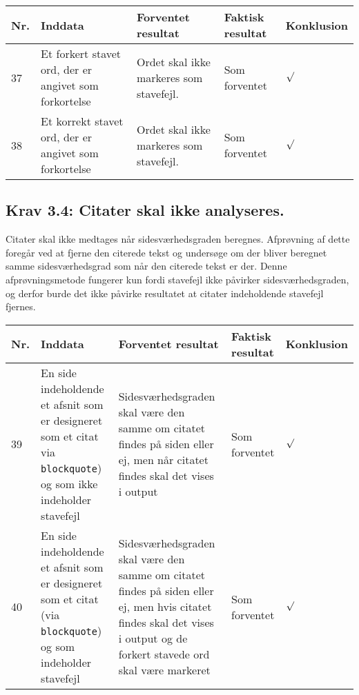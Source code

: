 \documentclass[a4paper,oneside,article]{memoir}
\begin{document}
\begin{landscape}
\begin{longtable}[c]{p{20pt}|p{220pt}|p{130pt}|p{130pt}|p{50pt}}
\textbf{Nr.} &
\textbf{Inddata} &
\textbf{Forventet resultat} &
\textbf{Faktisk resultat} &
\textbf{Konklusion} \\ \hline

37 &
Et forkert stavet ord, der er angivet som forkortelse &
Ordet skal ikke markeres som stavefejl. &
Som forventet &
$\surd$ \\ \hline

38 &
Et korrekt stavet ord, der er angivet som forkortelse &
Ordet skal ikke markeres som stavefejl. &
Som forventet &
$\surd$ \\ \hline

\end{longtable}

\subsection{Krav 3.4: Citater skal ikke analyseres.}

Citater skal ikke medtages når sidesværhedsgraden beregnes. Afprøvning
af dette foregår ved at fjerne den citerede tekst og undersøge om der
bliver beregnet samme sidesværhedsgrad som når den citerede tekst er
der. Denne afprøvningsmetode fungerer kun fordi stavefejl ikke
påvirker sidesværhedsgraden, og derfor burde det ikke påvirke
resultatet at citater indeholdende stavefejl fjernes.

\begin{longtable}[c]{p{20pt}|p{220pt}|p{130pt}|p{130pt}|p{50pt}}
\textbf{Nr.} &
\textbf{Inddata} &
\textbf{Forventet resultat} &
\textbf{Faktisk resultat} &
\textbf{Konklusion} \\ \hline

39 &
En side indeholdende et afsnit som er designeret som et citat
via \texttt{blockquote}) og som ikke indeholder stavefejl &
Sidesværhedsgraden skal være den samme om citatet findes på siden
eller ej, men når citatet findes skal det vises i output &
Som forventet &
$\surd$ \\ \hline

40 &
En side indeholdende et afsnit som er designeret som et citat (via
\texttt{blockquote}) og som indeholder stavefejl &
Sidesværhedsgraden skal være den samme om citatet findes på siden
eller ej, men hvis citatet findes skal det vises i output og de
forkert stavede ord skal være markeret &
Som forventet &
$\surd$ \\ \hline


\end{longtable}
\end{landscape}
\end{document}

